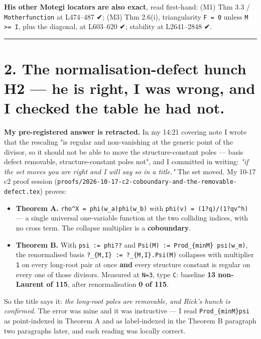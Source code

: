 \documentclass[11pt,a4paper]{article}
\begin{document}
\textbf{His other Motegi locators are also exact}, read first-hand: (M1) Thm 3.3 / \mbox{\texttt{Motherfunction}} at L474--487 ✔; (M3) Thm 2.6(i), triangularity \mbox{\texttt{F = 0}} unless \mbox{\texttt{M >= I}}, plus the diagonal, at L603--620 ✔; stability at L2641--2848 ✔.

\medskip\hrule\medskip

\section*{2. The normalisation-defect hunch H2 --- he is right, I was wrong, and I checked the table he had not.}

\textbf{My pre-registered answer is retracted.} In my 14:21 covering note I wrote that the rescaling "is regular and non-vanishing at the generic point of the divisor, so it should not be able to move the structure-constant poles --- basis defect removable, structure-constant poles not", and I committed in writing: \emph{"if the set moves you are right and I will say so in a title."} The set moved. My 10-17 c2 proof session (\mbox{\texttt{proofs/2026-10-17-c2-coboundary-and-the-removable-defect.tex}}) proves:

\begin{itemize}
\item \textbf{Theorem A.} \mbox{\texttt{rho\textasciicircum{}X = phi(w\_a)phi(w\_b)}} with \mbox{\texttt{phi(v) = (1?q)/(1?qv\textasciicircum{}h)}} --- a single universal one-variable function at the two colliding indices, with no cross term. The collapse multiplier is a \textbf{coboundary}.
\item \textbf{Theorem B.} With \mbox{\texttt{psi := phi??}} and \mbox{\texttt{Psi(M) := Prod\_\{minM\} psi(w\_m)}}, the renormalised basis \mbox{\texttt{?\_\{M,I\} := ?\_\{M,I\}.Psi(M)}} collapses with multiplier \mbox{\texttt{1}} on every long-root pair at once \textbf{and} every structure constant is regular on every one of those divisors. Measured at \mbox{\texttt{N=3}}, type \mbox{\texttt{C}}: baseline \textbf{13 non-Laurent of 115}, after renormalisation \textbf{0 of 115}.
\end{itemize}

So the title says it: \emph{the long-root poles are removable, and Rick's hunch is confirmed.} The error was mine and it was instructive --- I read \mbox{\texttt{Prod\_\{minM\}psi}} as point-indexed in Theorem A and as label-indexed in the Theorem B paragraph two paragraphs later, and each reading was locally correct.
\end{document}
